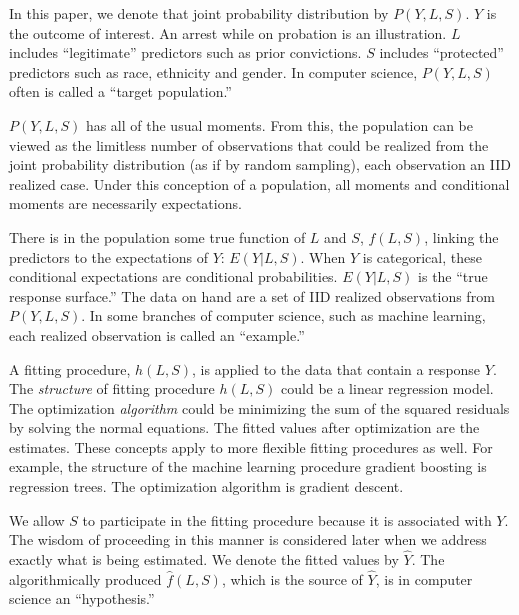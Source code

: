 \documentclass[12pt]{article}
\begin{document}
In this paper, we denote that joint probability distribution by $P(Y,L,S)$. $Y$ is the outcome of interest. An arrest while on probation is an illustration. $L$ includes ``legitimate'' predictors such as prior convictions. $S$ includes ``protected'' predictors such as race, ethnicity and gender. In computer science, $P(Y,L,S)$ often is called a ``target population.''

$P(Y,L,S)$ has all of the usual moments. From this, the population can be viewed as the limitless number of observations that could be realized from the joint probability distribution (as if by random sampling), each observation an IID realized case. Under this conception of a population, all moments and conditional moments are necessarily expectations.

There is in the population some true function of $L$ and $S$, $f(L,S)$, linking the predictors to the expectations of $Y$: $E(Y|L,S)$. When $Y$ is categorical, these conditional expectations are conditional probabilities. $E(Y|L,S)$ is the ``true response surface.'' The data on hand are a set of IID realized observations from $P(Y,L,S)$. In some branches of computer science, such as machine learning, each realized observation is called an ``example.'' 

A fitting procedure, $h(L,S)$, is applied to the data that contain a response $Y$. The \textit{structure} of fitting procedure $h(L,S)$ could be a linear regression model. The optimization \textit{algorithm} could be minimizing the sum of the squared residuals by solving the normal equations. The fitted values after optimization are the estimates. These concepts apply to more flexible fitting procedures as well. For example, the structure of the machine learning procedure gradient boosting is regression trees. The optimization algorithm is gradient descent. 

We allow $S$ to participate in the fitting procedure because it is associated with $Y$. The wisdom of proceeding in this manner is considered later when we address exactly what is being estimated. We denote the fitted values by $\hat{Y}$. The algorithmically produced $\hat{f}(L,S)$, which is the source of $\hat{Y}$, is in computer science an ``hypothesis.''
\end{document}
